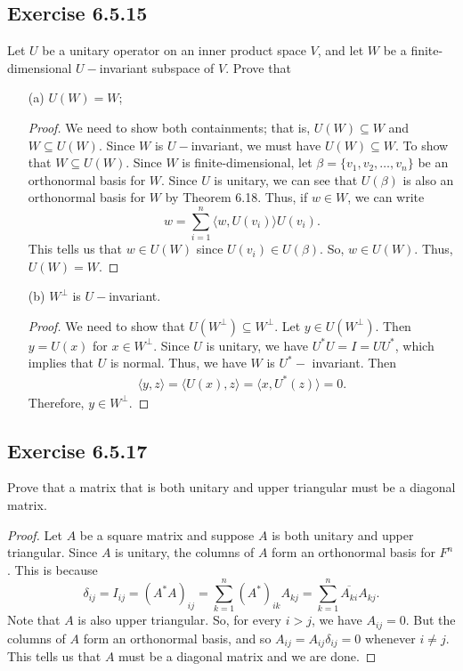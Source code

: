 \subsection*{Exercise 6.5.15} Let \( U  \) be a unitary operator on an inner product space \( V  \), and let \( W  \) be a finite-dimensional \( U- \)invariant subspace of \( V  \). Prove that 
\begin{enumerate}
    \item[(a)] \( U(W) =  W  \);
        \begin{proof}
        We need to show both containments; that is, \( U(W) \subseteq W  \) and \( W \subseteq U(W) \). Since \( W  \) is \( U- \)invariant, we must have \( U(W) \subseteq W  \). To show that \( W \subseteq U(W) \). Since \( W  \) is finite-dimensional, let \( \beta = \{ {v}_{1}, {v}_{2}, \dots, {v}_{n} \}  \) be an orthonormal basis for \( W  \). Since \( U  \) is unitary, we can see that \( U(\beta) \) is also an orthonormal basis for \( W  \) by Theorem 6.18. Thus, if \( w \in W  \), we can write
        \[  w = \sum_{ i=1  }^{ n } \langle w , U({v}_{i}) \rangle U({v}_{i}). \]
        This tells us that \( w \in U(W) \) since \( U({v}_{i}) \in U(\beta) \). So, \( w \in U(W) \). Thus, \( U(W) = W  \).
\end{proof}
    \item[(b)] \( W^{\perp}  \) is \( U- \)invariant.
        \begin{proof}
        We need to show that \( U(W^{\perp}) \subseteq W^{\perp} \). Let \( y \in U(W^{\perp}) \). Then \( y = U(x)  \) for \( x \in W^{\perp} \). Since \( U  \) is unitary, we have \( U^{*}U = I = U U^{*} \), which implies that \( U  \) is normal. Thus, we have \( W   \) is \( U^{*}-\) invariant. Then 
        \begin{align*}
           \langle y , z \rangle = \langle U(x) , z  \rangle  = \langle x  , U^{*}(z) \rangle = 0.   
        \end{align*}
        Therefore, \( y \in W^{\perp} \).
\end{proof}
\end{enumerate}

\subsection*{Exercise 6.5.17} Prove that a matrix that is both unitary and upper triangular must be a diagonal matrix.
\begin{proof}
Let \( A  \) be a square matrix and suppose \( A  \) is both unitary and upper triangular. Since \( A  \) is unitary, the columns of \( A  \) form an orthonormal basis for \( F^{n} \). This is because
\[  {\delta}_{ij} = I_{ij} = ( A^{*} A )_{ij} = \sum_{ k=1  }^{ n } (A^{*})_{ik} {A}_{kj}  = \sum_{ k=1  }^{ n } \overline{{A}_{ki}} {A}_{kj}.    \]
Note that \( A  \) is also upper triangular. So, for every \( i > j  \), we have \( {A}_{ij} = 0  \). But the columns of \( A  \) form an orthonormal basis, and so \( {A}_{ij} = {A}_{ij} {\delta}_{ij} = 0   \) whenever \( i \neq j  \). This tells us that \( A  \) must be a diagonal matrix and we are done.      \end{proof}

